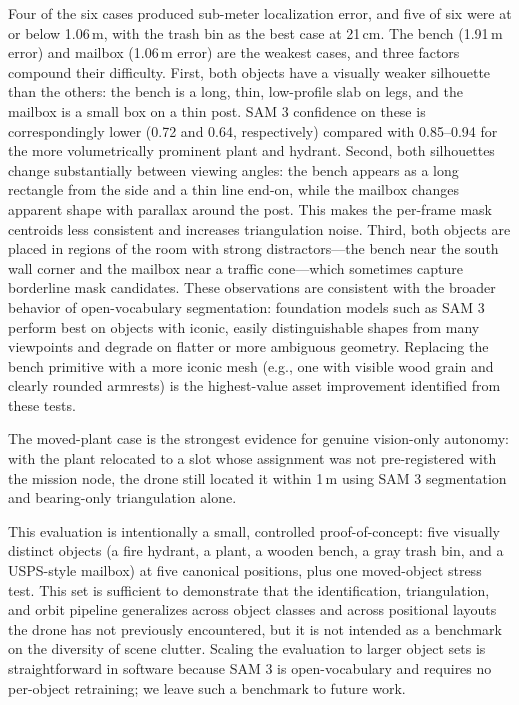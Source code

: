\documentclass[conference]{IEEEtran}
\begin{document}
Four of the six cases produced sub-meter localization error, and
five of six were at or below 1.06\,m, with the trash bin as the
best case at 21\,cm. The bench (1.91\,m error) and mailbox
(1.06\,m error) are the weakest cases, and three factors compound
their difficulty. First, both objects have a visually weaker
silhouette than the others: the bench is a long, thin, low-profile
slab on legs, and the mailbox is a small box on a thin post. SAM 3
confidence on these is correspondingly lower (0.72 and 0.64,
respectively) compared with 0.85--0.94 for the more volumetrically
prominent plant and hydrant. Second, both silhouettes change
substantially between viewing angles: the bench appears as a long
rectangle from the side and a thin line end-on, while the mailbox
changes apparent shape with parallax around the post. This makes the
per-frame mask centroids less consistent and increases triangulation
noise. Third, both objects are placed in regions of the room with
strong distractors---the bench near the south wall corner and the
mailbox near a traffic cone---which sometimes capture borderline
mask candidates. These observations are consistent with the broader
behavior of open-vocabulary segmentation: foundation models such as
SAM 3 perform best on objects with iconic, easily distinguishable
shapes from many viewpoints and degrade on flatter or more ambiguous
geometry. Replacing the bench primitive with a more iconic mesh
(e.g., one with visible wood grain and clearly rounded armrests) is
the highest-value asset improvement identified from these tests.

The moved-plant case is the strongest evidence for genuine
vision-only autonomy: with the plant relocated to a slot whose
assignment was not pre-registered with the mission node, the drone
still located it within 1\,m using SAM 3 segmentation and
bearing-only triangulation alone.

This evaluation is intentionally a small, controlled proof-of-concept:
five visually distinct objects (a fire hydrant, a plant, a wooden
bench, a gray trash bin, and a USPS-style mailbox) at five canonical
positions, plus one moved-object stress test. This set is sufficient
to demonstrate that the identification, triangulation, and orbit
pipeline generalizes across object classes and across positional
layouts the drone has not previously encountered, but it is not
intended as a benchmark on the diversity of scene clutter. Scaling the
evaluation to larger object sets is straightforward in software
because SAM 3 is open-vocabulary and requires no per-object retraining;
we leave such a benchmark to future work.
\end{document}
